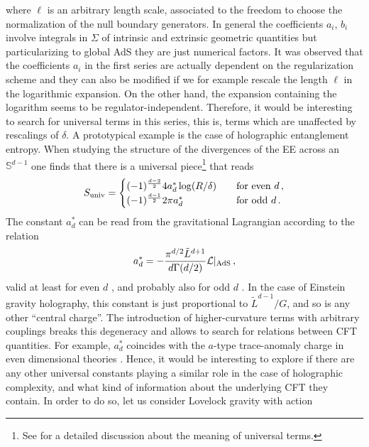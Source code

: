 \documentclass[11pt,letterpaper]{article}
\begin{document}
where $\ell$ is an arbitrary length scale, associated to the freedom to choose the normalization of the null boundary generators. In general the coefficients $a_i$, $b_i$ involve integrals in $\Sigma$ of intrinsic and extrinsic geometric quantities but particularizing to global AdS they are just numerical factors. It was observed that the coefficients $a_i$ in the first series are actually dependent on the regularization scheme and they can also be modified if we for example rescale the length $\ell$ in the logarithmic expansion. On the other hand, the expansion containing the logarithm seems to be regulator-independent. Therefore, it would be interesting to search for universal terms in this series, this is, terms which are unaffected by rescalings of $\delta$.  A prototypical example is the case of holographic entanglement entropy. When studying the structure of the divergences of the EE across an $\mathbb{S}^{d-1}$ one finds that there is a universal piece\footnote{See \cite{Casini:2015woa} for a detailed discussion about the meaning of universal terms.} that reads \cite{Ryu:2006ef,Nishioka:2009un,Myers:2010tj,Myers:2010xs,CHM}
\begin{equation}\label{asta}
S_{\rm univ}=\begin{cases}
(-1)^{\frac{d-2}{2}} 4a^*_d \log(R/\delta) \quad &\text{for even } d \, , \\
 (-1)^{\frac{d-1}{2}}2\pi a^*_d \quad &\text{for odd } d\, .
\end{cases}
\end{equation}
The constant $a^*_d$ can be read from the gravitational Lagrangian according to the relation 
\begin{equation}\label{astar}
a^*_d=-\frac{\pi^{d/2}\tilde{L}^{d+1}}{d \Gamma(d/2)}\mathcal{L}
|_{{\rm AdS}}\, ,
\end{equation}
valid at least for even $d$ \cite{Imbimbo:1999bj,Schwimmer:2008yh}, and probably also for odd $d$ \cite{Myers:2010tj,Myers:2010xs,Bueno:2018xqc}. In the case of Einstein gravity holography, this constant is just proportional to $\tilde L^{d-1}/G$, and so is any other ``central charge''. The introduction of higher-curvature terms with arbitrary couplings breaks this degeneracy and allows to search for relations between CFT quantities. For example, $a^*_d$ coincides with the $a$-type trace-anomaly charge in even dimensional theories  \cite{Myers:2010tj,Myers:2010xs}.
Hence, it would be interesting to explore if there are any other universal constants playing a similar role in the case of holographic complexity, and what kind of information about the underlying CFT they contain. In order to do so, let us consider Lovelock gravity with action
\end{document}
